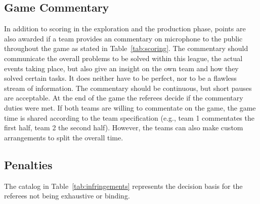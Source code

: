 \documentclass[12pt,twoside]{article}
\newcommand{\reftab}[1]{Table~\ref{#1}}
\begin{document}
\subsection{Game Commentary}
In addition to scoring in the exploration and the production phase,
points are also awarded if a team provides an commentary on microphone
to the public throughout the game as stated in \reftab{tab:scoring}.
The commentary should communicate the overall problems to be solved
within this league, the actual events taking place, but also give an
insight on the own team and how they solved certain tasks. It does
neither have to be perfect, nor to be a flawless stream of
information. The commentary should be continuous, but short pauses are
acceptable. At the end of the game the referees decide if the
commentary duties were met. If both teams are willing to commentate on
the game, the game time is shared according to the team specification
(e.g., team 1 commentates the first half, team 2 the second half).
However, the teams can also make custom arrangements to split the
overall time.

\subsection{Penalties}
The catalog in \reftab{tab:infringements} represents the decision
basis for the referees not being exhaustive or binding.
%
\end{document}
